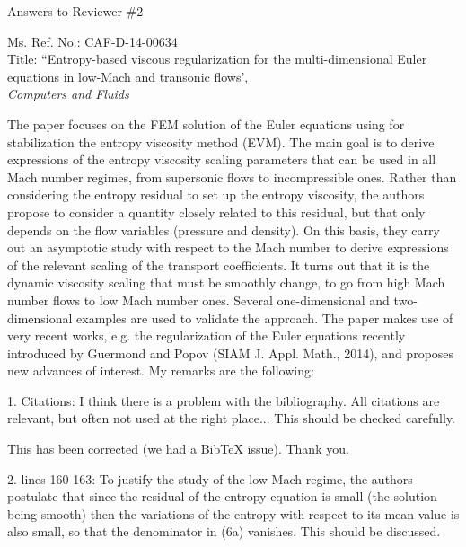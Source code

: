 \documentclass{article}
\begin{document}
\begin{center}
{ \Large Answers to Reviewer \#2}
\end{center}

\bigskip

\noindent Ms. Ref. No.: CAF-D-14-00634\\
Title: ``Entropy-based viscous regularization for the multi-dimensional Euler equations in low-Mach and transonic flows', \\
{\it Computers and Fluids}\\

\bigskip
\bigskip

{
\color{blue}
The paper focuses on the FEM solution of the Euler equations using for stabilization the entropy viscosity method (EVM). The main goal is to derive expressions of the entropy viscosity scaling parameters that can be used in all Mach number regimes, from supersonic flows to incompressible ones. Rather than considering the entropy residual to set up the entropy viscosity, the authors propose to consider a quantity closely related to this residual, but that only depends on the flow variables (pressure and density). On this basis, they carry out an asymptotic study with respect to the Mach number to derive expressions of the relevant scaling of the transport coefficients. It turns out that it is the dynamic viscosity scaling that must be smoothly change, to go  from high Mach number flows to low Mach number ones. Several one-dimensional and two-dimensional examples are used to validate the approach. The paper makes use of very recent works, e.g. the regularization
of the Euler equations recently introduced by Guermond and Popov  (SIAM J. Appl. Math., 2014), and proposes new advances of interest. My remarks are the following:
}

\bigskip

{
\color{blue}
1. Citations: I think there is a problem with the  bibliography. All citations are relevant, but often not used at the right place... This should be checked carefully.}

This has been corrected (we had a BibTeX issue). Thank you.
\bigskip


{
\color{blue}
2. lines 160-163: To justify the study of the low Mach regime, the authors postulate that since the residual of the entropy equation is small (the solution being smooth) then the variations of the entropy with respect to its mean value is also small, so that the denominator in (6a) vanishes. This should be discussed.}
\end{document}
